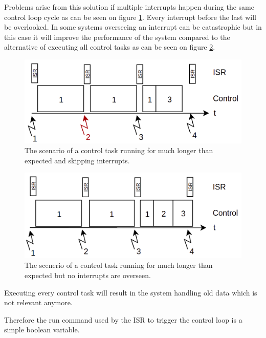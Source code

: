 Problems arise from this solution if multiple interrupts happen during the same control loop cycle as can be seen on figure \ref{fig:isr4}. Every interrupt before the last will be overlooked. In some systems overseeing an interrupt can be catastrophic but in this case it will improve the performance of the system compared to the alternative of executing all control tasks as can be seen on figure \ref{fig:isr3}.

\begin{figure}[H]
	\centering
	\includegraphics[width=0.65\linewidth]{pictures/software/isr/isr4.png}
	\caption{The scenario of a control task running for much longer than expected and skipping interrupts.}
	\label{fig:isr4}
\end{figure}

\begin{figure}[H]
	\centering
	\includegraphics[width=0.65\linewidth]{pictures/software/isr/isr3.png}
	\caption{The scenerio of a control task running for much longer than expected but no interrupts are overseen.}
	\label{fig:isr3}
\end{figure}


Executing every control task will result in the system handling old data which is not relevant anymore. 

Therefore the run command used by the ISR to trigger the control loop is a simple boolean variable.